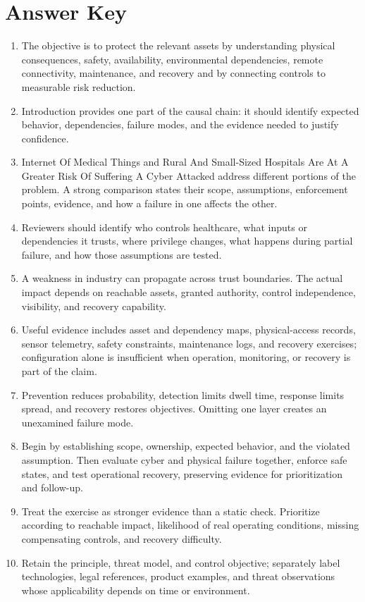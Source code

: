 \documentclass[11pt]{article}
\begin{document}
\section*{Answer Key}
\begin{enumerate}
\item The objective is to protect the relevant assets by understanding physical consequences, safety, availability, environmental dependencies, remote connectivity, maintenance, and recovery and by connecting controls to measurable risk reduction.
\item Introduction provides one part of the causal chain: it should identify expected behavior, dependencies, failure modes, and the evidence needed to justify confidence.
\item Internet Of Medical Things and Rural And Small-Sized Hospitals Are At A Greater Risk Of Suffering A Cyber Attacked address different portions of the problem. A strong comparison states their scope, assumptions, enforcement points, evidence, and how a failure in one affects the other.
\item Reviewers should identify who controls healthcare, what inputs or dependencies it trusts, where privilege changes, what happens during partial failure, and how those assumptions are tested.
\item A weakness in industry can propagate across trust boundaries. The actual impact depends on reachable assets, granted authority, control independence, visibility, and recovery capability.
\item Useful evidence includes asset and dependency maps, physical-access records, sensor telemetry, safety constraints, maintenance logs, and recovery exercises; configuration alone is insufficient when operation, monitoring, or recovery is part of the claim.
\item Prevention reduces probability, detection limits dwell time, response limits spread, and recovery restores objectives. Omitting one layer creates an unexamined failure mode.
\item Begin by establishing scope, ownership, expected behavior, and the violated assumption. Then evaluate cyber and physical failure together, enforce safe states, and test operational recovery, preserving evidence for prioritization and follow-up.
\item Treat the exercise as stronger evidence than a static check. Prioritize according to reachable impact, likelihood of real operating conditions, missing compensating controls, and recovery difficulty.
\item Retain the principle, threat model, and control objective; separately label technologies, legal references, product examples, and threat observations whose applicability depends on time or environment.
\end{enumerate}
\end{document}
